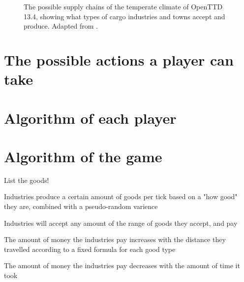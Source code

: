 \documentclass[logo,msc,dsti]{infthesis}    %
\begin{document}
\begin{figure}[h]
\caption{The possible supply chains of the temperate climate of OpenTTD 13.4, showing what types of cargo industries and towns accept and produce. Adapted from \cite{TemperateFlowChart}.}
\label{figure:temperate-supply-chains}
\end{figure}

\section{The possible actions a player can take}

\section{Algorithm of each player}

\section{Algorithm of the game}



List the goods!

\begin{itemize}
\begin{item}Industries produce a certain amount of goods per tick based on a "how good" they are, combined with a pseudo-random varience\end{item}
\begin{item}Industries will accept any amount of the range of goods they accept, and pay\end{item}
\begin{item}The amount of money the industries pay increases with the distance they travelled according to a fixed formula for each good type\end{item}
\begin{item}The amount of money the industries pay decreases with the amount of time it took\end{item}
\end{itemize}
\end{document}

